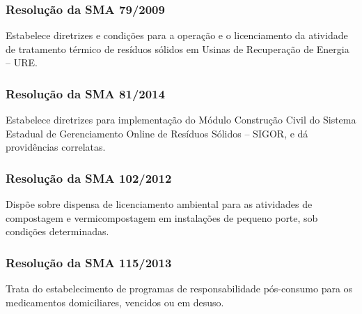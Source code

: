 \begin{subapend}
\begin{subsubapend}
		\subsubsection{Resolução da SMA 79/2009}
		Estabelece diretrizes e condições para a operação e o licenciamento da atividade de tratamento térmico de resíduos sólidos em Usinas de Recuperação de Energia – URE.
		\subsubsection{Resolução da SMA 81/2014}
		Estabelece diretrizes para implementação do Módulo Construção Civil do Sistema Estadual de Gerenciamento Online de Resíduos Sólidos – SIGOR, e dá providências correlatas.
		\subsubsection{Resolução da SMA 102/2012}
		Dispõe sobre dispensa de licenciamento ambiental para as atividades de compostagem e vermicompostagem em instalações de pequeno porte, sob condições determinadas.
		\subsubsection{Resolução da SMA 115/2013}
		Trata do estabelecimento de programas de responsabilidade pós-consumo para os medicamentos domiciliares, vencidos ou em desuso.
	\end{subsubapend}
\end{subapend}

